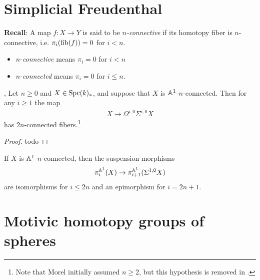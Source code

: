 \documentclass[11pt,openany]{book}
\begin{document}
\section{Simplicial Freudenthal}


\textbf{Recall}: A map $f\colon X \to Y$ is said to be $n$\textit{-connective} if its homotopy fiber is $n$-connective, i.e. $\pi_i(\mathrm{fib}(f)) = 0$ for $i<n$.
\begin{itemize}
    \item $n$-\textit{connective} means $\pi_i=0$ for $i<n$
    \item $n$-\textit{connected} means $\pi_i =0 $ for $i\le n$.
\end{itemize}


\begin{theorem} \cite[6.61]{Morel}, \cite[3.7]{ABH-nilpotent} Let $n\ge 0$ and $X\in \mathrm{Spc}(k)_\ast$, and suppose that $X$ is $\mathbb{A}^1$-$n$-connected. Then for any $i \ge 1$ the map
\begin{align*}
    X \to \Omega^{i,0}\Sigma^{i,0}X
\end{align*}
has $2n$-connected fibers.\footnote{Note that Morel initially assumed $n \ge 2$, but this hypothesis is removed in \cite{ABH-nilpotent}.}
\end{theorem}
\begin{proof} todo
\end{proof}

\begin{corollary} If $X$ is $\mathbb{A}^1$-$n$-connected, then the suspension morphisms
\begin{align*}
    \pi_i^{\mathbb{A}^1}(X) \to \pi_{i+1}^{\mathbb{A}^1}(\Sigma^{1,0}X)
\end{align*}
are isomorphisms for $i\le 2n$ and an epimorphism for $i=2n+1$.
\end{corollary}

\section{Motivic homotopy groups of spheres}
\end{document}
